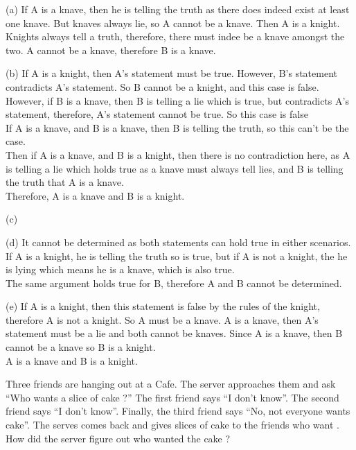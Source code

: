 \documentclass[addpoints]{exam}
\newenvironment{problem}[2][Problem]{\begin{trivlist}
    \item[\hskip \labelsep {\bfseries #1}\hskip \labelsep {\bfseries #2.}]}{\end{trivlist}}
\begin{document}
\begin{questions}
    \question
    \begin{solution}
        
        (a) If A is a knave, then he is telling the truth as there does indeed exist at least one knave. But knaves always lie, so A cannot be a knave. Then A is a knight. Knights always tell a truth, therefore, there must indee be a knave amongst the two. A cannot be a knave, therefore B is a knave.

        (b) If A is a knight, then A's statement must be true. However, B's statement contradicts A's statement. So B cannot be a knight, and this case is false. However, if B is a knave, then B is telling a lie which is true, but contradicts A's statement, therefore, A's statement cannot be true. So this case is false \\ 
        If A is a knave, and B is a knave, then B is telling the truth, so this can't be the case. \\ 
        Then if A is a knave, and B is a knight, then there is no contradiction here, as A is telling a lie which holds true as a knave must always tell lies, and B is telling the truth that A is a knave. \\ 
        Therefore, A is a knave and B is a knight. 

        (c)  

        (d) It cannot be determined as both statements can hold true in either scenarios. If A is a knight, he is telling the truth so is true, but if A is not a knight, the he is lying which means he is a knave, which is also true. \\ The same argument holds true for B, therefore A and B cannot be determined.

        (e) If A is a knight, then this statement is false by the rules of the knight, therefore A is not a knight. So A must be a knave. A is a knave, then A's statement must be a lie and both cannot be knaves. Since A is a knave, then B cannot be a knave so B is a knight. \\ A is a knave and B is a knight. 
    \end{solution}
\end{questions}

\begin{problem}{5}
Three friends are hanging out at a Cafe. The server approaches them and ask ``Who wants a slice of cake ?'' The first friend says ``I don't know''.
The second friend says ``I don't know''. Finally, the third friend says ``No, not everyone wants cake''. The serves comes back and gives slices of cake to the
friends who want . How did the server figure out who wanted the cake ? 
\end{problem}
\end{document}
